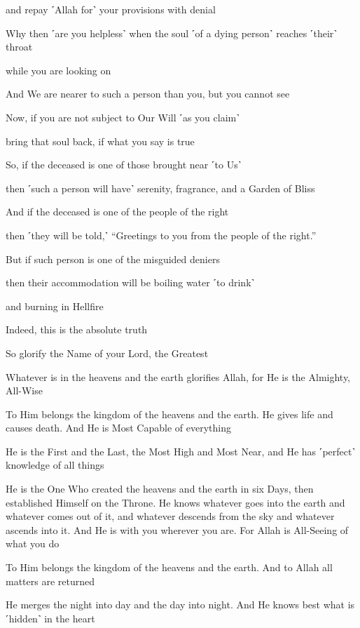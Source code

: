 and repay ˹Allah for˺ your provisions with denial

Why then ˹are you helpless˺ when the soul ˹of a dying person˺ reaches ˹their˺ throat

while you are looking on

And We are nearer to such a person than you, but you cannot see

Now, if you are not subject to Our Will ˹as you claim˺

bring that soul back, if what you say is true

So, if the deceased is one of those brought near ˹to Us˺

then ˹such a person will have˺ serenity, fragrance, and a Garden of Bliss

And if the deceased is one of the people of the right

then ˹they will be told,˺ “Greetings to you from the people of the right.”

But if such person is one of the misguided deniers

then their accommodation will be boiling water ˹to drink˺

and burning in Hellfire

Indeed, this is the absolute truth

So glorify the Name of your Lord, the Greatest

Whatever is in the heavens and the earth glorifies Allah, for He is the Almighty, All-Wise

To Him belongs the kingdom of the heavens and the earth. He gives life and causes death. And He is Most Capable of everything

He is the First and the Last, the Most High and Most Near, and He has ˹perfect˺ knowledge of all things

He is the One Who created the heavens and the earth in six Days, then established Himself on the Throne. He knows whatever goes into the earth and whatever comes out of it, and whatever descends from the sky and whatever ascends into it. And He is with you wherever you are. For Allah is All-Seeing of what you do

To Him belongs the kingdom of the heavens and the earth. And to Allah all matters are returned

He merges the night into day and the day into night. And He knows best what is ˹hidden˺ in the heart

